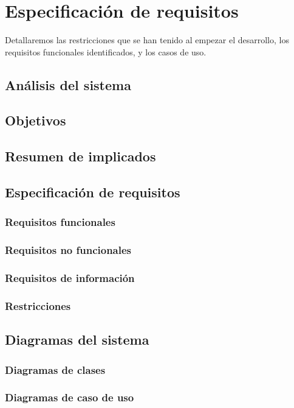 \chapter{Especificación de requisitos}

\bigskip
Detallaremos las restricciones que se han tenido al empezar el desarrollo, los requisitos funcionales identificados, y los casos de uso.

\newpage
\section{Análisis del sistema}

\newpage
\section{Objetivos}

\newpage
\section{Resumen de implicados}

\newpage
\section{Especificación de requisitos}


\subsection{Requisitos funcionales}

\subsection{Requisitos no funcionales}

\subsection{Requisitos de información}

\subsection{Restricciones}


\newpage
\section{Diagramas del sistema}

\subsection{Diagramas de clases}

\subsection{Diagramas de caso de uso}






